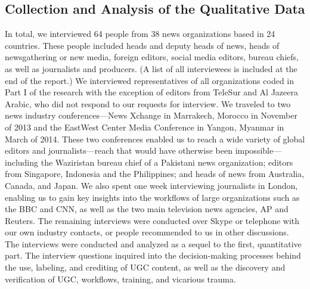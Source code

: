 \begin{enumerate}
\section{Collection and Analysis of the Qualitative Data}
In total, we interviewed 64 people from 38 news organizations based in 24
countries. These people included heads and deputy heads of news, heads of
newsgathering or new media, foreign editors, social media editors, bureau
chiefs, as well as journalists and producers. (A list of all interviewees is
included at the end of the report.)
We interviewed representatives of all organizations coded in Part I of the
research with the exception of editors from TeleSur and Al Jazeera Arabic,
who did not respond to our requests for interview.
We traveled to two news industry conferences—News Xchange in Marrakech,
Morocco in November of 2013 and the EastWest Center Media
Conference in Yangon, Myanmar in March of 2014. These two conferences
enabled us to reach a wide variety of global editors and journalists—reach
that would have otherwise been impossible—including the Waziristan
bureau chief of a Pakistani news organization; editors from Singapore,
Indonesia and the Philippines; and heads of news from Australia, Canada,
and Japan. We also spent one week interviewing journalists in London,
enabling us to gain key insights into the workflows of large organizations
such as the BBC and CNN, as well as the two main television news agencies,
AP and Reuters.
The remaining interviews were conducted over Skype or telephone
with our own industry contacts, or people recommended to us in
other discussions.
The interviews were conducted and analyzed as a sequel to the first, quantitative
part. The interview questions inquired into the decision-making
processes behind the use, labeling, and crediting of UGC content, as
well as the discovery and verification of UGC, workflows, training, and
vicarious trauma.


\end{enumerate}
